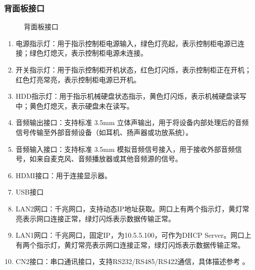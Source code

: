 \documentclass[a4paper,11pt,english,openany,oneside]{sphinxmanual}
\begin{document}
\subsubsection{背面板接口}
\label{\detokenize{08 _u5b89_u88c5_u4e0e_u8c03_u8bd5:id74}}\label{\detokenize{08 _u5b89_u88c5_u4e0e_u8c03_u8bd5:id75}}
\begin{figure}[H]
\centering
\capstart

\noindent{}
\caption{背面板接口}\label{\detokenize{08 _u5b89_u88c5_u4e0e_u8c03_u8bd5:id126}}\end{figure}


\begin{enumerate}
%
\item {} 
\sphinxAtStartPar
电源指示灯：用于指示控制柜电源输入，绿色灯亮起，表示控制柜电源已连接；绿色灯熄灭，表示控制柜电源未连接。

\item {} 
\sphinxAtStartPar
开关指示灯：用于指示控制柜开机状态，红色灯闪烁，表示控制柜正在开机；红色灯亮常亮，表示控制柜电源已开机。

\item {} 
\sphinxAtStartPar
HDD指示灯：用于指示机械硬盘状态指示，黄色灯闪烁，表示机械硬盘读写中；黄色灯熄灭，表示硬盘未在读写。

\item {} 
\sphinxAtStartPar
音频输出接口：支持标准 3.5mm 立体声输出，用于将设备内部处理后的音频信号传输至外部音频设备（如耳机、扬声器或功放系统）。

\item {} 
\sphinxAtStartPar
音频输入接口：支持标准 3.5mm 模拟音频信号接入，用于接收外部音频信号，如来自麦克风、音频播放器或其他音频源的信号。

\item {} 
\sphinxAtStartPar
HDMI接口：用于连接显示器。

\item {} 
 USB接口

\item {} 
\sphinxAtStartPar
LAN2网口：千兆网口，支持动态IP地址获取。网口上有两个指示灯，黄灯常亮表示网口连接正常，绿灯闪烁表示数据传输正常。

\item {} 
\sphinxAtStartPar
LAN1网口：千兆网口，固定IP，为10.5.5.100，可作为DHCP Server。网口上有两个指示灯，黄灯常亮表示网口连接正常，绿灯闪烁表示数据传输正常。

\item {} 
\sphinxAtStartPar
CN2接口：串口通讯接口，支持RS232/RS485/RS422通信，具体描述参考 {\hyperref[\detokenize{08 _u5b89_u88c5_u4e0e_u8c03_u8bd5:cn2}]{}} 。

\end{enumerate}
\end{document}
